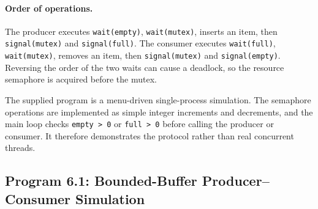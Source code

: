 \paragraph{Order of operations.}
The producer executes \texttt{wait(empty)}, \texttt{wait(mutex)}, inserts an item, then \texttt{signal(mutex)} and \texttt{signal(full)}. The consumer executes \texttt{wait(full)}, \texttt{wait(mutex)}, removes an item, then \texttt{signal(mutex)} and \texttt{signal(empty)}. Reversing the order of the two waits can cause a deadlock, so the resource semaphore is acquired before the mutex.

\begin{infobox}
The supplied program is a menu-driven single-process simulation. The semaphore operations are implemented as simple integer increments and decrements, and the main loop checks \texttt{empty > 0} or \texttt{full > 0} before calling the producer or consumer. It therefore demonstrates the protocol rather than real concurrent threads.
\end{infobox}

\subsection{Program 6.1: Bounded-Buffer Producer--Consumer Simulation}



